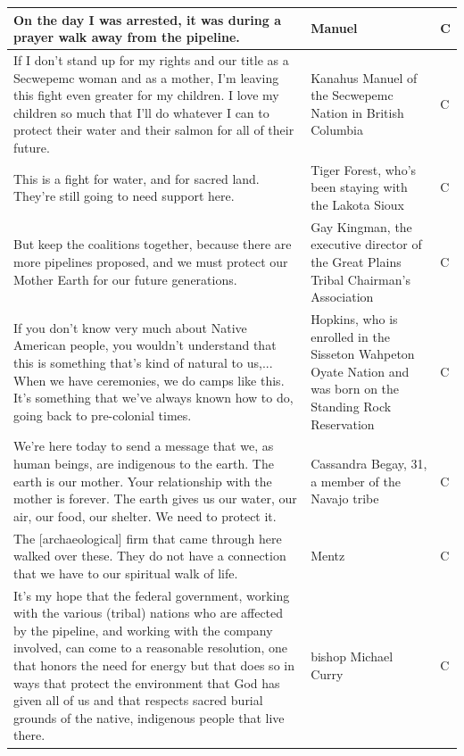 \begin{footnotesize}
\begin{spacing}{1}
\begin{longtable}{| p{} | P{.25\textwidth} | p{.07\textwidth}|}
On the day I was arrested, it was during a prayer walk away from the pipeline.                      & Manuel                                       & C              \\ \hline
If I don't stand up for my rights and our title as a Secwepemc woman and as a mother, I'm leaving this fight even greater for my children. I love my children so much that I'll do whatever I can to protect their water and their salmon for all of their future.                                                          & Kanahus Manuel of the Secwepemc Nation in British Columbia                                                     & C              \\ \hline
This is a fight for water, and for sacred land. They're still going to need support here.           & Tiger Forest, who's been staying with the Lakota Sioux                                                         & C              \\ \hline
But keep the coalitions together, because there are more pipelines proposed, and we must protect our Mother Earth for our future generations.                         & Gay Kingman, the executive director of the Great Plains Tribal Chairman's Association                          & C              \\ \hline
If you don't know very much about Native American people, you wouldn't understand that this is something that's kind of natural to us,... When we have ceremonies, we do camps like this. It's something that we've always known how to do, going back to pre-colonial times.                                                 & Hopkins, who is enrolled in the Sisseton Wahpeton Oyate Nation and was born on the Standing Rock Reservation   & C              \\ \hline
We're here today to send a message that we, as human beings, are indigenous to the earth. The earth is our mother. Your relationship with the mother is forever. The earth gives us our water, our air, our food, our shelter. We need to protect it.     & Cassandra Begay, 31, a member of the Navajo tribe                                                              & C              \\ \hline
The [archaeological] firm that came through here walked over these. They do not have a connection that we have to our spiritual walk of life.                         & Mentz                                        & C              \\ \hline
It's my hope that the federal government, working with the various (tribal) nations who are affected by the pipeline, and working with the company involved, can come to a reasonable resolution, one that honors the need for energy but that does so in ways that protect the environment that God has given all of us and that respects sacred burial grounds of the native, indigenous people that live there.                                                                & bishop Michael Curry                         & C              \\ \hline

\end{longtable}
\end{spacing}
\end{footnotesize}
